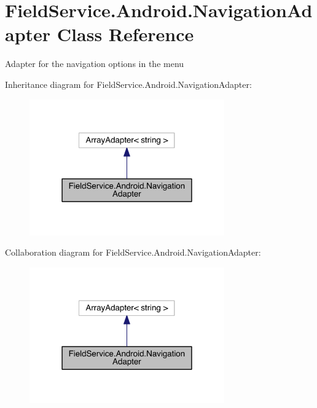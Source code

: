 \hypertarget{class_field_service_1_1_android_1_1_navigation_adapter}{\section{Field\+Service.\+Android.\+Navigation\+Adapter Class Reference}
\label{class_field_service_1_1_android_1_1_navigation_adapter}
}


Adapter for the navigation options in the menu  




Inheritance diagram for Field\+Service.\+Android.\+Navigation\+Adapter\+:
\nopagebreak
\begin{figure}[H]
\begin{center}
\leavevmode
\includegraphics[width=238pt]{class_field_service_1_1_android_1_1_navigation_adapter__inherit__graph}
\end{center}
\end{figure}


Collaboration diagram for Field\+Service.\+Android.\+Navigation\+Adapter\+:
\nopagebreak
\begin{figure}[H]
\begin{center}
\leavevmode
\includegraphics[width=238pt]{class_field_service_1_1_android_1_1_navigation_adapter__coll__graph}
\end{center}
\end{figure}
